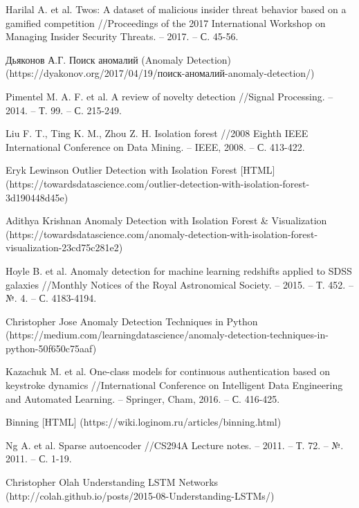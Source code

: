 \documentclass[12pt]{article}
\begin{document}
\begin{thebibliography}{20}
        Harilal A. et al. Twos: A dataset of malicious insider threat behavior based on a gamified competition //Proceedings of the 2017 International Workshop on Managing Insider Security Threats. – 2017. – С. 45-56.

        Дьяконов А.Г. Поиск аномалий (Anomaly Detection) (https://dyakonov.org/2017/04/19/поиск-аномалий-anomaly-detection/)

        Pimentel M. A. F. et al. A review of novelty detection //Signal Processing. – 2014. – Т. 99. – С. 215-249.

        Liu F. T., Ting K. M., Zhou Z. H. Isolation forest //2008 Eighth IEEE International Conference on Data Mining. – IEEE, 2008. – С. 413-422.

        Eryk Lewinson Outlier Detection with Isolation Forest [HTML] (https://towardsdatascience.com/outlier-detection-with-isolation-forest-3d190448d45e)

        Adithya Krishnan Anomaly Detection with Isolation Forest \& Visualization (https://towardsdatascience.com/anomaly-detection-with-isolation-forest-visualization-23cd75c281e2)

        Hoyle B. et al. Anomaly detection for machine learning redshifts applied to SDSS galaxies //Monthly Notices of the Royal Astronomical Society. – 2015. – Т. 452. – №. 4. – С. 4183-4194.

        Christopher Jose Anomaly Detection Techniques in Python (https://medium.com/learningdatascience/anomaly-detection-techniques-in-python-50f650c75aaf)

        Kazachuk M. et al. One-class models for continuous authentication based on keystroke dynamics //International Conference on Intelligent Data Engineering and Automated Learning. – Springer, Cham, 2016. – С. 416-425.

        Binning [HTML] (https://wiki.loginom.ru/articles/binning.html)

        Ng A. et al. Sparse autoencoder //CS294A Lecture notes. – 2011. – Т. 72. – №. 2011. – С. 1-19.

        Christopher Olah Understanding LSTM Networks (http://colah.github.io/posts/2015-08-Understanding-LSTMs/)
        
    \end{thebibliography}
\end{document}
